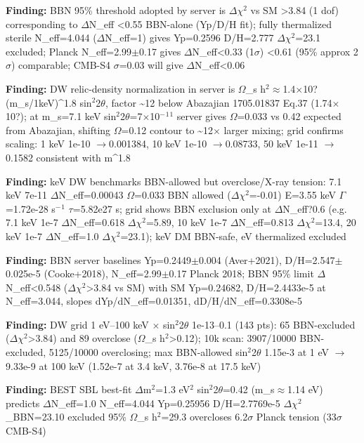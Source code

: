 \documentclass[11pt,a4paper]{article}
\begin{document}
\textbf{Finding:} BBN 95\% threshold adopted by server is $\Delta$$\chi$$^2$ vs SM \textgreater{}3.84 (1 dof) corresponding to $\Delta$N\_eff \textless{}0.55 BBN-alone (Yp/D/H fit); fully thermalized sterile N\_eff=4.044 ($\Delta$N\_eff=1) gives Yp=0.2596 D/H=2.777 $\Delta$$\chi$$^2$=23.1 excluded; Planck N\_eff=2.99$\pm$0.17 gives $\Delta$N\_eff\textless{}0.33 (1$\sigma$) \textless{}0.61 (95\% approx 2$\sigma$) comparable; CMB-S4 $\sigma$=0.03 will give $\Delta$N\_eff\textless{}0.06

\textbf{Finding:} DW relic-density normalization in server is $\Omega$\_s h$^2$$\approx$1.4$\times$10? (m\_s/1keV)\textasciicircum{}1.8 sin$^2$2$\theta$, factor \textasciitilde{}12 below Abazajian 1705.01837 Eq.37 (1.74$\times$10?); at m\_s=7.1 keV sin$^2$2$\theta$=7$\times$10$^-$$^1$$^1$ server gives $\Omega$=0.033 vs 0.42 expected from Abazajian, shifting $\Omega$=0.12 contour to \textasciitilde{}12$\times$ larger mixing; grid confirms scaling: 1 keV 1e-10 $\to$0.001384, 10 keV 1e-10 $\to$0.08733, 50 keV 1e-11 $\to$0.1582 consistent with m\textasciicircum{}1.8

\textbf{Finding:} keV DW benchmarks BBN-allowed but overclose/X-ray tension: 7.1 keV 7e-11 $\Delta$N\_eff=0.00043 $\Omega$=0.033 BBN allowed ($\Delta$$\chi$$^2$=-0.01) E=3.55 keV $\Gamma$=1.72e-28 s$^-$$^1$ $\tau$=5.82e27 s; grid shows BBN exclusion only at $\Delta$N\_eff?0.6 (e.g. 7.1 keV 1e-7 $\Delta$N\_eff=0.618 $\Delta$$\chi$$^2$=5.89, 10 keV 1e-7 $\Delta$N\_eff=0.813 $\Delta$$\chi$$^2$=13.4, 20 keV 1e-7 $\Delta$N\_eff=1.0 $\Delta$$\chi$$^2$=23.1); keV DM BBN-safe, eV thermalized excluded

\textbf{Finding:} BBN server baselines Yp=0.2449$\pm$0.004 (Aver+2021), D/H=2.547$\pm$0.025e-5 (Cooke+2018), N\_eff=2.99$\pm$0.17 Planck 2018; BBN 95\% limit $\Delta$N\_eff\textless{}0.548 ($\Delta$$\chi$$^2$\textgreater{}3.84 vs SM) with SM Yp=0.24682, D/H=2.4433e-5 at N\_eff=3.044, slopes dYp/dN\_eff=0.01351, dD/H/dN\_eff=0.3308e-5

\textbf{Finding:} DW grid 1 eV--100 keV $\times$ sin$^2$2$\theta$ 1e-13--0.1 (143 pts): 65 BBN-excluded ($\Delta$$\chi$$^2$\textgreater{}3.84) and 89 overclose ($\Omega$\_s h$^2$\textgreater{}0.12); 10k scan: 3907/10000 BBN-excluded, 5125/10000 overclosing; max BBN-allowed sin$^2$2$\theta$ 1.15e-3 at 1 eV $\to$ 9.33e-9 at 100 keV (1.52e-7 at 3.4 keV, 3.76e-8 at 17.5 keV)

\textbf{Finding:} BEST SBL best-fit $\Delta$m$^2$=1.3 eV$^2$ sin$^2$2$\theta$=0.42 (m\_s$\approx$1.14 eV) predicts $\Delta$N\_eff=1.0 N\_eff=4.044 Yp=0.25956 D/H=2.7769e-5 $\Delta$$\chi$$^2$\_BBN=23.10 excluded 95\% $\Omega$\_s h$^2$=29.3 overcloses 6.2$\sigma$ Planck tension (33$\sigma$ CMB-S4)
\end{document}
